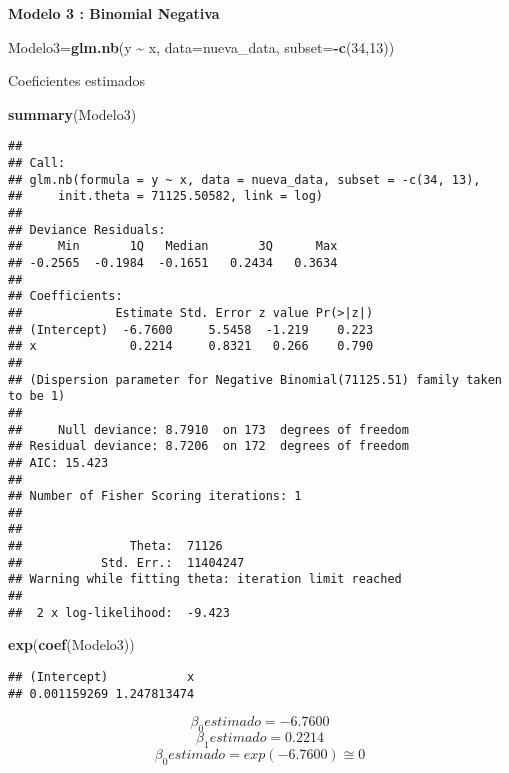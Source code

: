 \documentclass[]{article}
\newenvironment{Shaded}{\begin{snugshade}}{\end{snugshade}}
\newcommand{\DataTypeTok}[1]{\textcolor[rgb]{0.13,0.29,0.53}{#1}}
\newcommand{\DecValTok}[1]{\textcolor[rgb]{0.00,0.00,0.81}{#1}}
\newcommand{\KeywordTok}[1]{\textcolor[rgb]{0.13,0.29,0.53}{\textbf{#1}}}
\newcommand{\NormalTok}[1]{#1}
\newcommand{\OperatorTok}[1]{\textcolor[rgb]{0.81,0.36,0.00}{\textbf{#1}}}
\newcommand{\StringTok}[1]{\textcolor[rgb]{0.31,0.60,0.02}{#1}}
\begin{document}
\textbf{Modelo 3 : Binomial Negativa}

\begin{Shaded}
\begin{Highlighting}[]
\NormalTok{Modelo3=}\KeywordTok{glm.nb}\NormalTok{(y }\OperatorTok{\textasciitilde{}}\StringTok{ }\NormalTok{x, }\DataTypeTok{data=}\NormalTok{nueva\_data, }\DataTypeTok{subset=}\OperatorTok{{-}}\KeywordTok{c}\NormalTok{(}\DecValTok{34}\NormalTok{,}\DecValTok{13}\NormalTok{))}
\end{Highlighting}
\end{Shaded}

Coeficientes estimados

\begin{Shaded}
\begin{Highlighting}[]
\KeywordTok{summary}\NormalTok{(Modelo3)                  }
\end{Highlighting}
\end{Shaded}

\begin{verbatim}
## 
## Call:
## glm.nb(formula = y ~ x, data = nueva_data, subset = -c(34, 13), 
##     init.theta = 71125.50582, link = log)
## 
## Deviance Residuals: 
##     Min       1Q   Median       3Q      Max  
## -0.2565  -0.1984  -0.1651   0.2434   0.3634  
## 
## Coefficients:
##             Estimate Std. Error z value Pr(>|z|)
## (Intercept)  -6.7600     5.5458  -1.219    0.223
## x             0.2214     0.8321   0.266    0.790
## 
## (Dispersion parameter for Negative Binomial(71125.51) family taken to be 1)
## 
##     Null deviance: 8.7910  on 173  degrees of freedom
## Residual deviance: 8.7206  on 172  degrees of freedom
## AIC: 15.423
## 
## Number of Fisher Scoring iterations: 1
## 
## 
##               Theta:  71126 
##           Std. Err.:  11404247 
## Warning while fitting theta: iteration limit reached 
## 
##  2 x log-likelihood:  -9.423
\end{verbatim}

\begin{Shaded}
\begin{Highlighting}[]
\KeywordTok{exp}\NormalTok{(}\KeywordTok{coef}\NormalTok{(Modelo3))}
\end{Highlighting}
\end{Shaded}

\begin{verbatim}
## (Intercept)           x 
## 0.001159269 1.247813474
\end{verbatim}

\[\beta_0  estimado = -6.7600\] \[\beta_1  estimado = 0.2214\]
\[\beta_0  estimado = exp(-6.7600)  \cong 0\]
\end{document}
